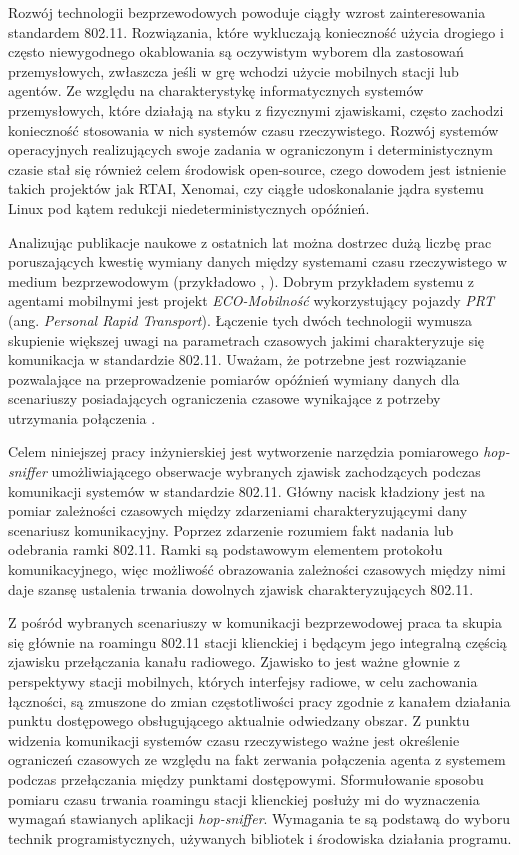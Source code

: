 
Rozwój technologii bezprzewodowych powoduje ciągły wzrost zainteresowania standardem 802.11. Rozwiązania, które wykluczają konieczność użycia drogiego i często niewygodnego okablowania są oczywistym wyborem dla zastosowań przemysłowych, zwłaszcza jeśli w grę wchodzi użycie mobilnych stacji lub agentów. Ze względu na charakterystykę informatycznych systemów przemysłowych, które działają na styku z fizycznymi zjawiskami, często zachodzi konieczność stosowania w nich systemów czasu rzeczywistego. Rozwój systemów operacyjnych realizujących swoje zadania w ograniczonym i deterministycznym czasie stał się również celem środowisk open-source, czego dowodem jest istnienie takich projektów jak RTAI, Xenomai, czy ciągłe udoskonalanie jądra systemu Linux pod kątem redukcji niedeterministycznych opóźnień. 

Analizując publikacje naukowe z ostatnich lat można dostrzec dużą liczbę prac poruszających kwestię wymiany danych między systemami czasu rzeczywistego w medium bezprzewodowym (przykładowo \cite{pub:AdvAp}, \cite{pub:SpaceTimeCoding}). Dobrym przykładem systemu z agentami mobilnymi jest projekt \emph{ECO-Mobilność} \cite{www:ECO-Mob} wykorzystujący pojazdy \emph{PRT} (ang. \emph{Personal Rapid Transport}). Łączenie tych dwóch technologii wymusza skupienie większej uwagi na parametrach czasowych jakimi charakteryzuje się komunikacja w standardzie 802.11. Uważam, że potrzebne jest rozwiązanie pozwalające na przeprowadzenie pomiarów opóźnień wymiany danych dla scenariuszy posiadających ograniczenia czasowe wynikające z potrzeby utrzymania połączenia \cite{pub:VirtualAP}. 

Celem niniejszej pracy inżynierskiej jest wytworzenie narzędzia pomiarowego \emph{hop-sniffer} umożliwiającego obserwacje wybranych zjawisk zachodzących podczas komunikacji systemów w standardzie 802.11. Główny nacisk kładziony jest na pomiar zależności czasowych między zdarzeniami charakteryzującymi dany scenariusz komunikacyjny. Poprzez zdarzenie rozumiem fakt nadania lub odebrania ramki 802.11. Ramki są podstawowym elementem protokołu komunikacyjnego, więc możliwość obrazowania zależności czasowych między nimi daje szansę ustalenia trwania dowolnych zjawisk charakteryzujących 802.11.

Z pośród wybranych scenariuszy w komunikacji bezprzewodowej praca ta skupia się głównie na roamingu 802.11 stacji klienckiej i będącym jego integralną częścią zjawisku przełączania kanału radiowego. Zjawisko to jest ważne głownie z perspektywy stacji mobilnych, których interfejsy radiowe, w celu zachowania łączności, są zmuszone do zmian częstotliwości pracy zgodnie z kanałem działania punktu dostępowego obsługującego aktualnie odwiedzany obszar. Z punktu widzenia komunikacji systemów czasu rzeczywistego ważne jest określenie ograniczeń czasowych ze względu na fakt zerwania połączenia agenta z systemem podczas przełączania między punktami dostępowymi. Sformułowanie sposobu pomiaru czasu trwania roamingu stacji klienckiej posłuży mi do wyznaczenia wymagań stawianych aplikacji \emph{hop-sniffer}. Wymagania te są podstawą do wyboru technik programistycznych, używanych bibliotek i środowiska działania programu.

